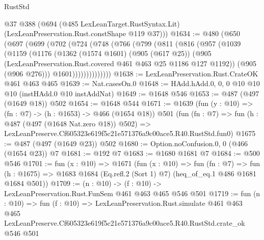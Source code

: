 \begin{lexlean}{RustStd}
\begin{coremodule}
      @37
      @388
      (@694 (@485 LexLeanTarget.RustSyntax.Lit) (LexLeanPreservation.Rust.constShape @119 @37)))
@1634 := @480
    (@650
      (@697
        (@699
          (@702
            (@724
              (@748
                (@766
                  (@799
                    (@811
                      (@816
                        (@957
                          (@1039
                            (@1159
                              (@1176
                                (@1362
                                  (@1574 @1601)
                                  (@905 (@617 @25))
                                  (@905
                                    (LexLeanPreservation.Rust.covered
                                      @461
                                      @463
                                      @25
                                      @1186
                                      @127
                                      @1192))
                                  (@905 (@906 @276)))
                                @1601))))))))))))))
@1638 := LexLeanPreservation.Rust.CrateOK @461 @463 @465
@1639 := Nat.casesOn.{0}
@1648 := HAdd.hAdd.{0, 0, 0} @10 @10 @10 (instHAdd.{0} @10 instAddNat)
@1649 := @1648 @546
@1653 := @487 (@497 (@1649 @18)) @502
@1654 := @1648 @544
@1671 := @1639
    (fun (y : @10) => (fn : @7) -> (h : @1653) -> @466 (@1654 @18))
    @501
    (fun (fn : @7) =>
    fun (h : @487 (@497 (@1648 Nat.zero @18)) @502) =>
    LexLeanPreserve.Cf605323e619f5c21e571376a9c00ace5.R40.RustStd.fun0)
@1675 := @487 (@497 (@1649 @23)) @502
@1680 := Option.noConfusion.{0, 0} (@466 (@1654 @23)) @7
@1681 := @192 @7
@1683 := @1680 @1681 @7
@1684 := @500 @546
@1701 := fun (x : @10) =>
  @1671
    (fun (x : @10) =>
    fun (fn : @7) =>
    fun (h : @1675) => @1683 @1684 (Eq.refl.{2} (Sort 1) @7) (heq_of_eq.{1} @486 @1681 @1684 @501))
@1709 := (n : @10) -> (f : @10) -> LexLeanPreservation.Rust.FunSem @461 @463 @465 @546 @501
@1719 := fun (n : @10) =>
  fun (f : @10) =>
  LexLeanPreservation.Rust.simulate
    @461
    @463
    @465
    LexLeanPreserve.Cf605323e619f5c21e571376a9c00ace5.R40.RustStd.crate_ok
    @546
    @501
\end{coremodule}
\end{lexlean}

